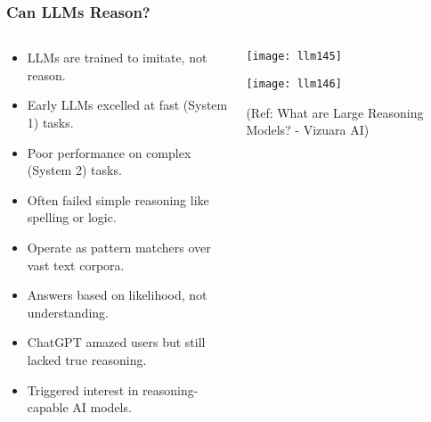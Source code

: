 \begin{frame}[fragile]\frametitle{Can LLMs Reason?}


\begin{columns}
    \begin{column}[T]{0.5\linewidth}
		\begin{itemize}
		  \item LLMs are trained to imitate, not reason.
		  \item Early LLMs excelled at fast (System 1) tasks.
		  \item Poor performance on complex (System 2) tasks.
		  \item Often failed simple reasoning like spelling or logic.
		  \item Operate as pattern matchers over vast text corpora.
		  \item Answers based on likelihood, not understanding.
		  \item ChatGPT amazed users but still lacked true reasoning.
		  \item Triggered interest in reasoning-capable AI models.
		\end{itemize}

    \end{column}
    \begin{column}[T]{0.5\linewidth}
		\begin{center}
		\texttt{[image: llm145]}

		\texttt{[image: llm146]}
		
		{\tiny (Ref: What are Large Reasoning Models? - Vizuara AI)}
		
		\end{center}
    \end{column}
  \end{columns}
	

\end{frame}

